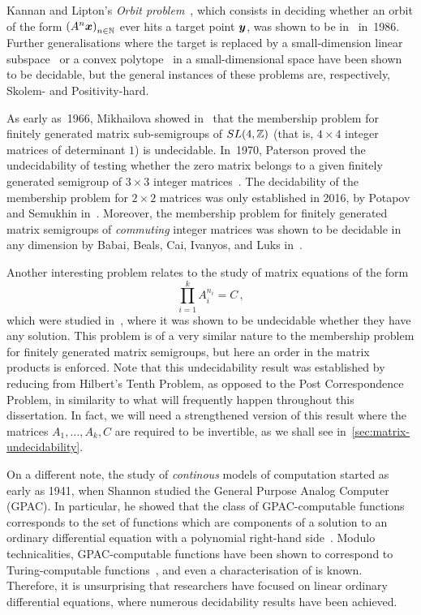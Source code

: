 Kannan and Lipton's \emph{Orbit problem}~\cite{KL86}, which consists in deciding whether an orbit of the form ${(A^{n} \boldsymbol{x})}_{n \in \mathbb{N}}$ ever hits a target point $\boldsymbol{y}$, was shown to be in~\PTIME{} in~1986. Further generalisations where the target is replaced by a small-dimension linear subspace~\cite{COW13} or a convex polytope~\cite{COW15:SODA} in a small-dimensional space have been shown to be decidable, but the general instances of these problems are, respectively, Skolem- and Positivity-hard.

As early as~1966, Mikhailova showed in~\cite[in Russian]{Mik66} that the membership problem for finitely generated matrix sub-semigroups of $SL(4,\mathbb{Z})$ (that is, $4\times 4$ integer matrices of determinant $1$) is undecidable.
In~1970, Paterson proved the undecidability of testing whether the zero matrix belongs to a given finitely generated semigroup of $3 \times 3$ integer matrices~\cite{Paterson}.
The decidability of the membership problem for $2 \times 2$ matrices was only established in 2016, by Potapov and Semukhin in~\cite{PS2Z}.
Moreover, the membership problem for finitely generated matrix semigroups of \emph{commuting} integer matrices was shown to be decidable in any dimension by Babai, Beals, Cai, Ivanyos, and Luks in~\cite{MultiplicativeMatrixEquations}.

Another interesting problem relates to the study of matrix equations of the form
\begin{equation*}
  \prod\limits_{i=1}^{k} A_{i}^{n_{i}} = C \, ,
\end{equation*}
which were studied in~\cite{MEHTP}, where it was shown to be undecidable whether they have any solution. This problem is of a very similar nature to the membership problem for finitely generated matrix semigroups, but here an order in the matrix products is enforced. Note that this undecidability result was established by reducing from Hilbert's Tenth Problem, as opposed to the Post Correspondence Problem, in similarity to what will frequently happen throughout this dissertation. In fact, we will need a strengthened version of this result where the matrices $A_{1}, \ldots, A_{k}, C$ are required to be invertible, as we shall see in~\cref{sec:matrix-undecidability}.

On a different note, the study of \emph{continous} models of computation started as early as 1941, when Shannon studied the General Purpose Analog Computer (GPAC).
In particular, he showed that the class of GPAC-computable functions corresponds to the set of functions which are components of a solution to an ordinary differential equation with a polynomial right-hand side~\cite{Shannon1941}.
Modulo technicalities, GPAC-computable functions have been shown to correspond to Turing-computable functions~\cite{Bournez1,Bournez2}, and even a characterisation of \PTIME{} is known.
Therefore, it is unsurprising that researchers have focused on linear ordinary differential equations, where numerous decidability results have been achieved.

